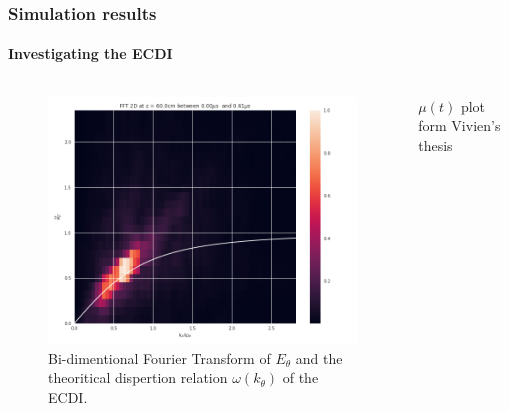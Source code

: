 \documentclass[sans, aspectratio=169]{beamer}
\begin{document}
\begin{frame} 
	\frametitle{Simulation results} 
	\framesubtitle{ Investigating the ECDI } 
	
	
	\begin{columns}

	\begin{column}{0.45\linewidth}
	
		\begin{figure}[hbtp]
			\centering
			\includegraphics[scale=0.22]{images/2D_FFT.png} 
			\caption{Bi-dimentional Fourier Transform of $E_{\theta}$ and the theoritical dispertion relation $\omega(k_{\theta})$ of the ECDI.}
		\end{figure}
		
	\end{column}
	
	\begin{column}{0.45\linewidth}
	$\mu(t)$ plot form Vivien's thesis
	\end{column}


\end{columns}


\end{frame}
\end{document}
